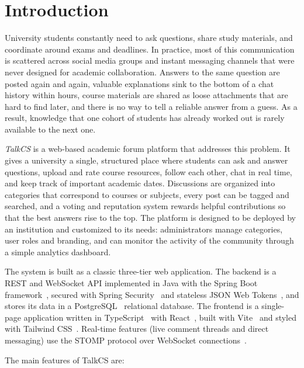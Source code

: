 \chapter{Introduction}
\label{ch:introduction}

University students constantly need to ask questions, share study materials, and
coordinate around exams and deadlines. In practice, most of this communication is
scattered across social media groups and instant messaging channels that were never
designed for academic collaboration. Answers to the same question are posted again
and again, valuable explanations sink to the bottom of a chat history within hours,
course materials are shared as loose attachments that are hard to find later, and
there is no way to tell a reliable answer from a guess. As a result, knowledge that
one cohort of students has already worked out is rarely available to the next one.

\emph{TalkCS} is a web-based academic forum platform that addresses this problem. It
gives a university a single, structured place where students can ask and answer
questions, upload and rate course resources, follow each other, chat in real time,
and keep track of important academic dates. Discussions are organized into
categories that correspond to courses or subjects, every post can be tagged and
searched, and a voting and reputation system rewards helpful contributions so that
the best answers rise to the top. The platform is designed to be deployed by an
institution and customized to its needs: administrators manage categories, user
roles and branding, and can monitor the activity of the community through a simple
analytics dashboard.

The system is built as a classic three-tier web application. The backend is a
REST and WebSocket API implemented in Java with the Spring Boot framework~\cite{springboot},
secured with Spring Security~\cite{springsecurity} and stateless JSON Web Tokens~\cite{jwt},
and stores its data in a PostgreSQL~\cite{postgresql} relational database. The frontend is a
single-page application written in TypeScript~\cite{typescript} with React~\cite{react}, built with
Vite~\cite{vite} and styled with Tailwind CSS~\cite{tailwind}. Real-time features (live comment
threads and direct messaging) use the STOMP protocol over WebSocket connections~\cite{stomp}.

The main features of TalkCS are:

